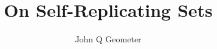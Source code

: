 \documentclass[12pt,a4paper]{amsart}
\numberwithin{equation}{section}
\begin{document}
\title{On Self-Replicating Sets}

\author{John Q Geometer}

\maketitle
\end{document}
